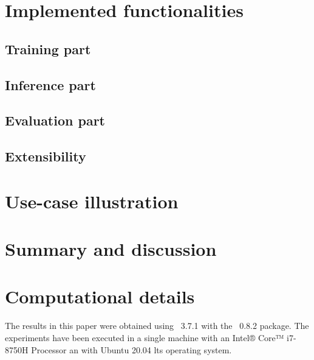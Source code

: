 \documentclass[article]{jss}
\begin{document}
\section{Implemented functionalities}


\subsection{Training part}
\label{subsec:training}


\subsection{Inference part}
\label{subsec:inference}


\subsection{Evaluation part}
\label{subsec:evaluation}


\subsection{Extensibility} %
\label{subsec:extensibility}


\section{Use-case illustration}


\section{Summary and discussion} \label{sec:summary}



\section*{Computational details}

The results in this paper were obtained using ~3.7.1
with the ~0.8.2 package. The experiments have been executed
in a single machine with an Intel® Core™ i7-8750H Processor an with
Ubuntu 20.04 lts operating system.


\clearpage


\end{document}
